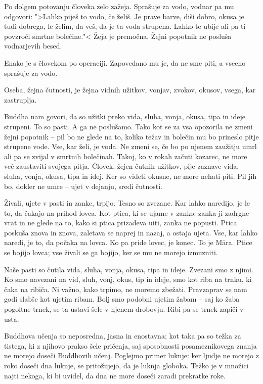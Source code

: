 Po dolgem potovanju človeka zelo zažeja. Sprašuje za vodo, vodnar pa mu odgovori: ">Lahko piješ to vodo, če želiš. Je prave barve, diši dobro, okusa je tudi dobrega, le želim, da veš, da je ta voda strupena. Lahko te ubije ali pa ti povzroči smrtne bolečine."< Žeja je premočna. Žejni popotnik ne posluša vodnarjevih besed.

Enako je s človekom po operaciji. Zapovedano mu je, da ne sme piti, a vseeno sprašuje za vodo.

Oseba, žejna čutnosti, je žejna vidnih užitkov, vonjav, zvokov, okusov, vsega, kar zastruplja.

Buddha nam govori, da so užitki preko vida, sluha, vonja, okusa, tipa in ideje strupeni. To so pasti. A ga ne poslušamo. Tako kot se za vsa opozorila ne zmeni žejni popotnik – pil bo ne glede na to, koliko težav in bolečin mu bo prineslo pitje strupene vode. Vse, kar želi, je voda. Ne zmeni se, če bo po njenem zaužitju umrl ali pa se zvijal v smrtnih bolečinah. Takoj, ko v rokah začuti kozarec, ne more več zaustaviti svojega pitja. Človek, žejen čutnih užitkov, pije zaznave vida, sluha, vonja, okusa, tipa in idej. Ker so videti okusne, ne more nehati piti. Pil jih bo, dokler ne umre – ujet v dejanju, sredi čutnosti.

\clearpage


Živali, ujete v pasti in zanke, trpijo. Tesno so zvezane. Kar lahko naredijo, je le to, da čakajo na prihod lovca. Kot ptica, ki se ujame v zanko: zanka ji zadrgne vrat in ne glede na to, kako si ptica prizadeva uiti, zanka ne popusti. Ptica poskuša znova in znova, zaletava se naprej in nazaj, a ostaja ujeta. Vse, kar lahko naredi, je to, da počaka na lovca. Ko pa pride lovec, je konec. To je Māra. Ptice se bojijo lovca; vse živali se ga bojijo, ker se mu ne morejo izmuzniti.

Naše pasti so čutila vida, sluha, vonja, okusa, tipa in ideje. Zvezani smo z njimi. Ko smo navezani na vid, sluh, vonj, okus, tip in ideje, smo kot riba na trnku, ki čaka na ribiča. Ni važno, kako trpimo, ne moremo zbežati. Pravzaprav se nam godi slabše kot ujetim ribam. Bolj smo podobni ujetim žabam – saj ko žaba pogoltne trnek, se ta ustavi šele v njenem drobovju. Ribi pa se trnek zapiči v usta.

\clearpage


Buddhova učenja so neposredna, jasna in enostavna; kot taka pa so težka za tistega, ki z njihovo prakso šele pričenja, saj sposobnosti posameznikovega znanja ne morejo doseči Buddhovih učenj. Poglejmo primer luknje: ker ljudje ne morejo z roko doseči dna luknje, se pritožujejo, da je luknja globoka. Težko je v množici najti nekoga, ki bi uvidel, da dna ne more doseči zaradi prekratke roke.

